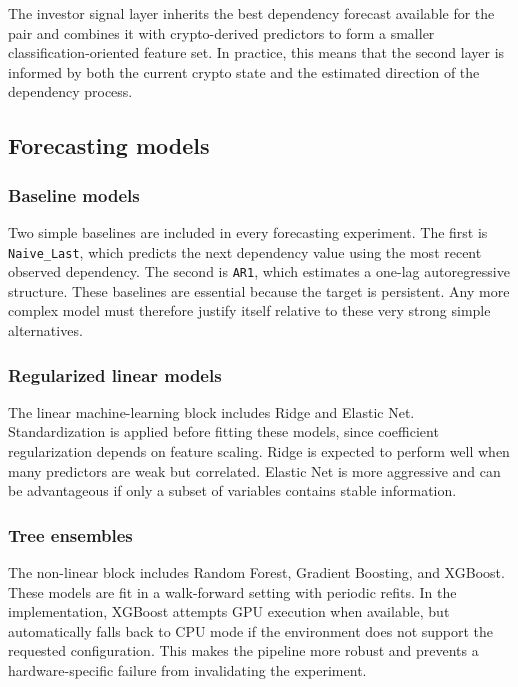 The investor signal layer inherits the best dependency forecast available for the pair and combines it with crypto-derived predictors to form a smaller classification-oriented feature set. In practice, this means that the second layer is informed by both the current crypto state and the estimated direction of the dependency process.

\subsection{Forecasting models}

\subsubsection{Baseline models}

Two simple baselines are included in every forecasting experiment. The first is \texttt{Naive\_Last}, which predicts the next dependency value using the most recent observed dependency. The second is \texttt{AR1}, which estimates a one-lag autoregressive structure. These baselines are essential because the target is persistent. Any more complex model must therefore justify itself relative to these very strong simple alternatives.

\subsubsection{Regularized linear models}

The linear machine-learning block includes Ridge and Elastic Net. Standardization is applied before fitting these models, since coefficient regularization depends on feature scaling. Ridge is expected to perform well when many predictors are weak but correlated. Elastic Net is more aggressive and can be advantageous if only a subset of variables contains stable information.

\subsubsection{Tree ensembles}

The non-linear block includes Random Forest, Gradient Boosting, and XGBoost. These models are fit in a walk-forward setting with periodic refits. In the implementation, XGBoost attempts GPU execution when available, but automatically falls back to CPU mode if the environment does not support the requested configuration. This makes the pipeline more robust and prevents a hardware-specific failure from invalidating the experiment.

